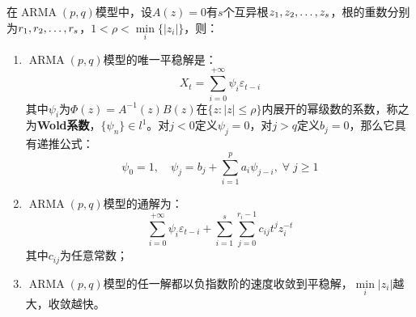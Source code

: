 \begin{theorem}\label{theo:ARMAPQSolution}
	在$\operatorname{ARMA}(p,q)$模型中，设$A(z)=0$有$s$个互异根$z_1, z_2, \dots, z_{s}$，根的重数分别为$r_1, r_2, \dots, r_{s}$，$1<\rho<\min\limits_i\{|z_i|\}$，则：
	\begin{enumerate}
		\item $\operatorname{ARMA}(p,q)$模型的唯一平稳解是：
		\begin{equation*}
			X_t=\sum_{i=0}^{+\infty}\psi_i\varepsilon_{t-i}
		\end{equation*}
		其中$\psi_i$为$\Phi(z)=A^{-1}(z)B(z)$在$\{z:|z|\leqslant\rho\}$内展开的幂级数的系数，称之为\textbf{Wold系数}，$\{\psi_n\}\in l^1$。对$j<0$定义$\psi_j=0$，对$j>q$定义$b_j=0$，那么它具有递推公式：
		\begin{equation*}
			\psi_0=1,\quad\psi_j=b_j+\sum_{i=1}^{p}a_i\psi_{j-i},\;\forall\;j\geqslant1
		\end{equation*}
		\item $\operatorname{ARMA}(p,q)$模型的通解为：
		\begin{equation*}
			\sum_{i=0}^{+\infty}\psi_i\varepsilon_{t-i}+\sum_{i=1}^{s}\sum_{j=0}^{r_i-1}c_{ij}t^{j}z_i^{-t}
		\end{equation*}
		其中$c_{ij}$为任意常数；
		\item $\operatorname{ARMA}(p,q)$模型的任一解都以负指数阶的速度收敛到平稳解，$\min\limits_i{|z_i|}$越大，收敛越快。
	\end{enumerate}
\end{theorem}
